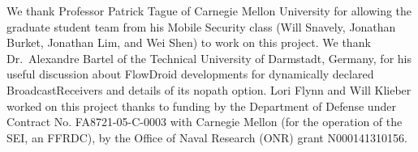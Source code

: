 \begin{acknowledgments}
We thank Professor Patrick Tague of Carnegie Mellon University for allowing the graduate student team from his Mobile Security class (Will Snavely, Jonathan Burket, Jonathan Lim, and Wei Shen) to work on this project. We thank Dr.\ Alexandre Bartel of the Technical University of Darmstadt, Germany, for his useful discussion about FlowDroid developments for dynamically declared BroadcastReceivers and details of its nopath option. Lori Flynn and Will Klieber worked on this project thanks to funding by the Department of Defense under Contract No. FA8721-05-C-0003 with Carnegie Mellon (for the operation of the SEI, an FFRDC), by the Office of Naval Research (ONR) grant N000141310156.
\end{acknowledgments}
